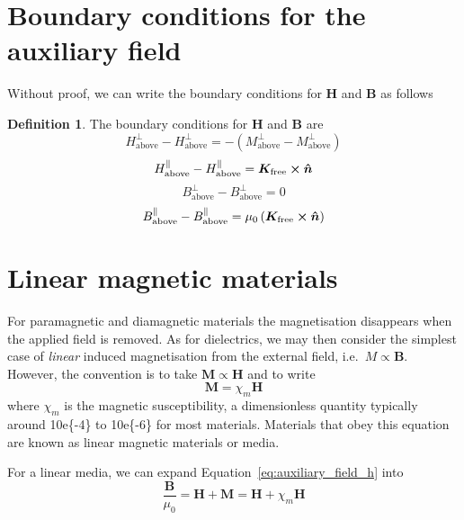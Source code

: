 \documentclass[12pt,chapterprefix=false,dvipsnames]{scrbook}
\theoremstyle{dotless}
\theoremstyle{definition}
\newtheorem{protodefinition}{Definition}[section]
\newenvironment{definition}
{\colorlet{shadecolor}{black!15}\begin{shaded}\begin{protodefinition}}
			{\end{protodefinition}\end{shaded}}
\begin{document}
\section{Boundary conditions for the auxiliary field}%
\label{sec:boundary_conditions_for_the_auxiliary_field}

Without proof, we can write the boundary conditions for
$\bm{H}$ and $\bm{B}$ as follows

\begin{definition}
	The boundary conditions for $\bm{H}$ and
	$\bm{B}$ are
	\begin{equation}
		H^\perp_{\mathrm{above}} - H^\perp_{\mathrm{above}} =
		-\left(M^\perp_{\mathrm{above}} - M^\perp_{\mathrm{above}}\right)
	\end{equation}
	\begin{equation}
		H^\parallel_{\mathrm{above}} - H^\parallel_{\mathrm{above}} =
		\bm{K}_{\mathrm{free}}\cross\bm{\hat{n}}
	\end{equation}
	\begin{equation}
		B^\perp_{\mathrm{above}} - B^\perp_{\mathrm{above}} = 0
	\end{equation}
	\begin{equation}
		B^\parallel_{\mathrm{above}} - B^\parallel_{\mathrm{above}} =
		\mu_{0}\left(\bm{K}_{\mathrm{free}}\cross\bm{\hat{n}}\right)
	\end{equation}
\end{definition}

\section{Linear magnetic materials}%
\label{sec:linear_magnetic_materials}

For paramagnetic and diamagnetic materials the magnetisation
disappears when the applied field is removed. As for
dielectrics, we may then consider the simplest case of
\textit{linear} induced magnetisation from the external
field, i.e.\ $M\propto\bm{B}$. However, the convention is
to take $\bm{M}\propto\bm{H}$ and to write
\begin{equation}
	\bm{M} =
	\chi_{m}\bm{H}
\end{equation}
where $\chi_m$ is the magnetic susceptibility, a
dimensionless quantity typically around \SI{10e{-4}}{}
to \SI{10e{-6}}{} for most materials. Materials that
obey this equation are known as linear magnetic materials or
media.

For a linear media, we can expand
Equation~\ref{eq:auxiliary_field_h} into
\begin{equation}
	\frac{\bm{B}}{\mu_{0}}
	=
	\bm{H} + \bm{M}
	=
	\bm{H} + \chi_m\bm{H}
\end{equation}
\end{document}
